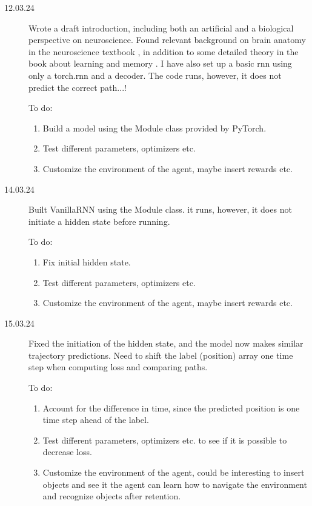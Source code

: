 \begin{description}
    \item[12.03.24] Wrote a draft introduction, including both an artificial and a biological perspective on neuroscience. Found relevant background on brain anatomy in the neuroscience textbook \cite{bear:2016:neuroscience}, in addition to some detailed theory in the book about learning and memory \cite{byrne:2008:learning_memory}. I have also set up a basic rnn using only a torch.rnn and a decoder. The code runs, however, it does not predict the correct path...! 

    To do: %
    \begin{enumerate}
        \item Build a model using the Module class provided by PyTorch.
        \item Test different parameters, optimizers etc.
        \item Customize the environment of the agent, maybe insert rewards etc.
    \end{enumerate}

    \item[14.03.24] Built VanillaRNN using the Module class. it runs, however, it does not initiate a hidden state before running. 

    To do: %
    \begin{enumerate}
        \item Fix initial hidden state.
        \item Test different parameters, optimizers etc.
        \item Customize the environment of the agent, maybe insert rewards etc.
    \end{enumerate}

    \item[15.03.24] Fixed the initiation of the hidden state, and the model now makes similar trajectory predictions. Need to shift the label (position) array one time step when computing loss and comparing paths.

    To do: %
    \begin{enumerate}
        \item Account for the difference in time, since the predicted position is one time step ahead of the label.
        \item Test different parameters, optimizers etc. to see if it is possible to decrease loss. 
        \item Customize the environment of the agent, could be interesting to insert objects and see it the agent can learn how to navigate the environment and recognize objects after retention.
    \end{enumerate}


\end{description}
